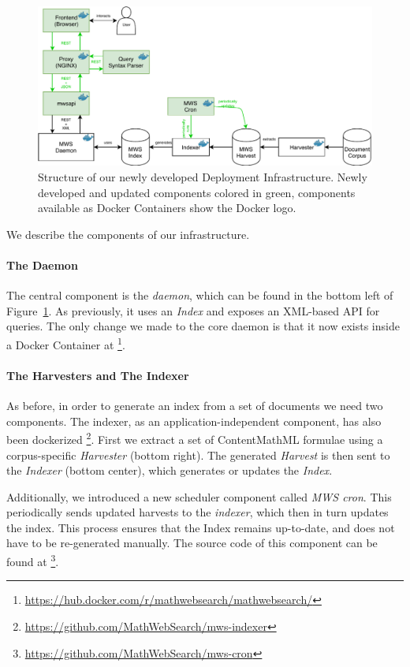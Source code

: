 \begin{figure}[ht]
  \includegraphics[width=1.0\textwidth]{mws_layout.pdf}
  \caption{Structure of our newly developed \MWS Deployment Infrastructure. Newly developed and updated components colored in green, components available as Docker Containers show the Docker logo.  }\label{fig:mwsdeployment}
\end{figure}

We describe the components of our infrastructure. 

\paragraph{The \MWS Daemon}
The central component is the \textit{\MWS daemon}, which can be found in the bottom left of Figure~\ref{fig:mwsdeployment}. 
As previously, it uses an \textit{Index} and exposes an XML-based API for queries. 
The only change we made to the core daemon is that it now exists inside a Docker Container at \footnote{\url{https://hub.docker.com/r/mathwebsearch/mathwebsearch/}}. 

\paragraph{The Harvesters and The Indexer}
As before, in order to generate an index from a set of documents we need two components. 
The indexer, as an application-independent component, has also been dockerized \footnote{\url{https://github.com/MathWebSearch/mws-indexer}}. 
First we extract a set of ContentMathML formulae using a corpus-specific \textit{Harvester} (bottom right). 
The generated \textit{Harvest} is then sent to the \textit{Indexer} (bottom center), which generates or updates the \textit{Index}. 

Additionally, we introduced a new scheduler component called \textit{MWS cron}. 
This periodically sends updated harvests to the \textit{indexer}, which then in turn updates the index. 
This process ensures that the Index remains up-to-date, and does not have to be re-generated manually. 
The source code of this component can be found at \footnote{\url{https://github.com/MathWebSearch/mws-cron}}. 


